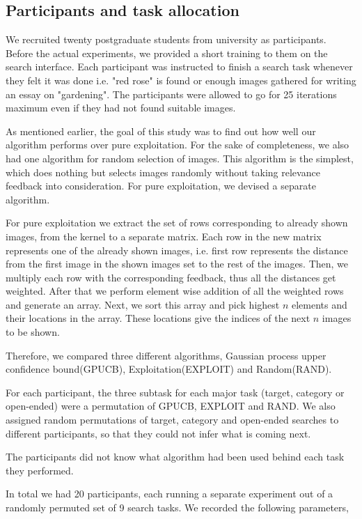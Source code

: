 \documentclass[english]{tktltiki}
\begin{document}
\subsection{Participants and task allocation}

We recruited twenty postgraduate students from university as participants. Before the actual experiments, we provided a short training to them on the search interface. Each participant was instructed to finish a search task whenever they felt it was done i.e. "red rose" is found or enough images gathered for writing an essay on "gardening". The participants were allowed to go for 25 iterations maximum even if they had not found suitable images.

As mentioned earlier, the goal of this study was to find out how well our algorithm performs over pure exploitation. For the sake of completeness, we also had one algorithm for random selection of images. This algorithm is the simplest, which does nothing but selects images randomly without taking relevance feedback into consideration. For pure exploitation, we devised a separate algorithm. 

For pure exploitation we extract the set of rows corresponding to already shown images, from the kernel to a separate matrix. Each row in the new matrix represents one of the already shown images, i.e. first row represents the distance from the first image in the shown images set to the rest of the images. Then, we multiply each row with the corresponding feedback, thus all the distances get weighted. After that we perform element wise addition of all the weighted rows and generate an array. Next, we sort this array and pick highest $n$ elements and their locations in the array. These locations give the indices of the next $n$ images to be shown.

Therefore, we compared three different algorithms, Gaussian process upper confidence bound(GPUCB), Exploitation(EXPLOIT) and Random(RAND).

For each participant, the three subtask for each major task (target, category or open-ended) were a permutation of GPUCB, EXPLOIT and RAND. We also assigned random permutations of target, category and open-ended searches to different participants, so that they could not infer what is coming next.

The participants did not know what algorithm had been used behind each task they performed.

In total we had 20 participants, each running a separate experiment out of a randomly permuted set of 9 search tasks. We recorded the following parameters,
\end{document}
